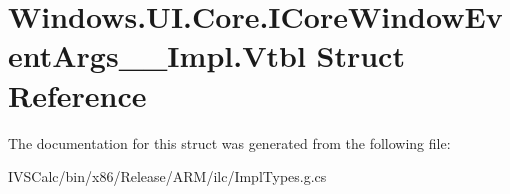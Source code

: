 \hypertarget{struct_windows_1_1_u_i_1_1_core_1_1_i_core_window_event_args_____impl_1_1_vtbl}{}\section{Windows.\+U\+I.\+Core.\+I\+Core\+Window\+Event\+Args\+\_\+\+\_\+\+Impl.\+Vtbl Struct Reference}
\label{struct_windows_1_1_u_i_1_1_core_1_1_i_core_window_event_args_____impl_1_1_vtbl}


The documentation for this struct was generated from the following file\+:\begin{DoxyCompactItemize}
\item 
I\+V\+S\+Calc/bin/x86/\+Release/\+A\+R\+M/ilc/Impl\+Types.\+g.\+cs\end{DoxyCompactItemize}
